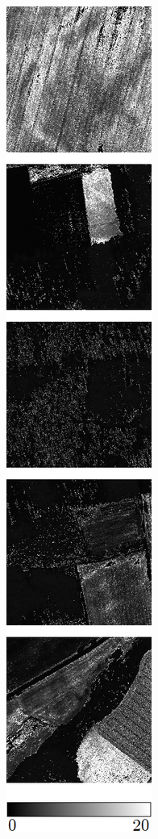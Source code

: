 \begin{figure}[h]
\begin{subfigure}{\VegetationImageWidth}
        \caption{}
        \label{fig:svi_evi}
    \end{subfigure} \hspace{2mm}
    \begin{subfigure}{\VegetationImageWidth}
        \includegraphics[width=\textwidth]{images/vegetation/savi}

\end{subfigure}
\end{figure}
